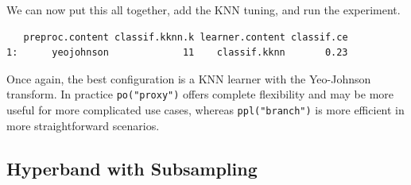 We can now put this all together, add the KNN tuning, and run the
experiment.

\begin{Shaded}
\begin{Highlighting}[]
\OtherTok{=} \NormalTok{(}
   \NormalTok{(}\NormalTok{, }\NormalTok{,}
    \SpecialCharTok{==} \NormalTok{),}
\NormalTok{)}

\OtherTok{=} \NormalTok{(}\NormalTok{(}
  \NormalTok{(}\NormalTok{, } \NormalTok{, } \NormalTok{), }\NormalTok{(}\NormalTok{),}

\SpecialCharTok{$}\NormalTok{result)[,}
    \NormalTok{ x\_domain[[}\NormalTok{]]}\SpecialCharTok{$}\SpecialCharTok{$}\SpecialCharTok{$}\SpecialCharTok{$}
\NormalTok{]}
\end{Highlighting}
\end{Shaded}

\begin{verbatim}
   preproc.content classif.kknn.k learner.content classif.ce
1:      yeojohnson             11    classif.kknn       0.23
\end{verbatim}

Once again, the best configuration is a KNN learner with the Yeo-Johnson
transform. In practice \texttt{po("proxy")} offers complete flexibility
and may be more useful for more complicated use cases, whereas
\texttt{ppl("branch")} is more efficient in more straightforward
scenarios.

\hypertarget{sec-hyperband-example-svm}{%
\subsection{Hyperband with
Subsampling}\label{sec-hyperband-example-svm}}

